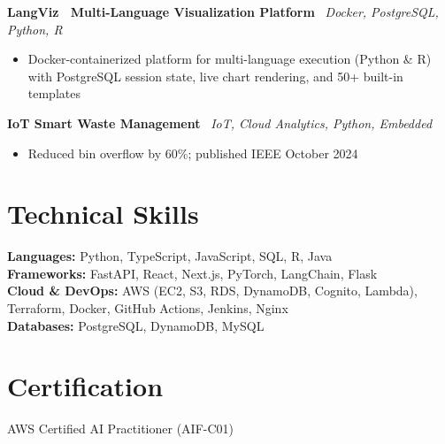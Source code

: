 \documentclass[10pt,letterpaper]{article}
\newcommand{\projentry}[2]{%
  \vspace{1pt}\noindent
  \textbf{#1} \textemdash\ \textit{\small #2}%
  \vspace{-2pt}
}
\newenvironment{bullets}{%
  \begin{itemize}[leftmargin=1.3em, itemsep=0pt, topsep=3pt, parsep=0pt, partopsep=0pt]\small
}{%
  \end{itemize}\vspace{1pt}
}
\begin{document}
\projentry{LangViz \textemdash\ Multi-Language Visualization Platform}{Docker, PostgreSQL, Python, R}
\begin{bullets}
  \item Docker-containerized platform for multi-language execution (Python \& R) with PostgreSQL session state, live chart rendering, and 50+ built-in templates
\end{bullets}

\projentry{IoT Smart Waste Management}{IoT, Cloud Analytics, Python, Embedded}
\begin{bullets}
  \item Reduced bin overflow by 60\%; published IEEE October 2024
\end{bullets}

\section{Technical Skills}

\small\noindent
\textbf{Languages:} Python, TypeScript, JavaScript, SQL, R, Java\\[2pt]
\textbf{Frameworks:} FastAPI, React, Next.js, PyTorch, LangChain, Flask\\[2pt]
\textbf{Cloud \& DevOps:} AWS (EC2, S3, RDS, DynamoDB, Cognito, Lambda), Terraform, Docker, GitHub Actions, Jenkins, Nginx\\[2pt]
\textbf{Databases:} PostgreSQL, DynamoDB, MySQL

\section{Certification}
\small AWS Certified AI Practitioner (AIF-C01)
\end{document}
